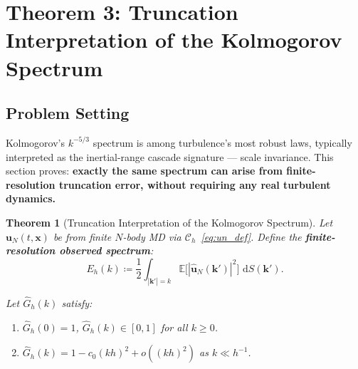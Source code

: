 \documentclass[11pt,a4paper]{article}
\newtheorem{theorem}{Theorem}[section]
\theoremstyle{definition}
\theoremstyle{remark}
\newcommand{\E}{\mathbb{E}}
\newcommand{\abs}[1]{\left\lvert#1\right\rvert}
\newcommand{\dd}{\,\mathrm{d}}
\newcommand{\uN}{\bm{u}_N}
\begin{document}
\section{Theorem 3: Truncation Interpretation of the Kolmogorov Spectrum}

\subsection{Problem Setting}

Kolmogorov's $k^{-5/3}$ spectrum is among turbulence's most robust laws, typically interpreted as the inertial-range cascade signature --- scale invariance. This section proves: \textbf{exactly the same spectrum can arise from finite-resolution truncation error, without requiring any real turbulent dynamics.}

\begin{theorem}[Truncation Interpretation of the Kolmogorov Spectrum]
\label{thm:kolmogorov_truncation}
Let $\uN(t, \bm{x})$ be from finite $N$-body MD via $\mathcal{C}_h$~\eqref{eq:un_def}. Define the \textbf{finite-resolution observed spectrum}:
\begin{equation}\label{eq:E_h_def}
  E_h(k) \coloneqq \frac{1}{2} \int_{\abs{\bm{k}'} = k} \E\bigl[|\hat{\bm{u}}_N(\bm{k}')|^2\bigr] \,\dd S(\bm{k}').
\end{equation}

Let $\hat{G}_h(k)$ satisfy:
\begin{enumerate}[label=(F\arabic*),leftmargin=*]
  \item $\hat{G}_h(0) = 1$, $\hat{G}_h(k) \in [0, 1]$ for all $k \geq 0$.
  \item $\hat{G}_h(k) = 1 - c_0 (kh)^{2} + o((kh)^2)$ as $k \ll h^{-1}$.
\end{enumerate}
\end{theorem}
\end{document}
